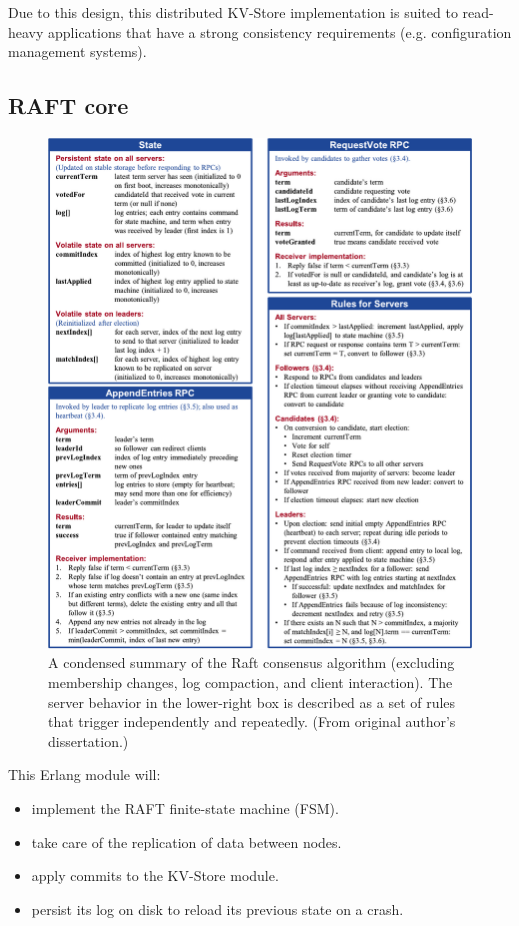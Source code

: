 \documentclass[a4paper]{article}
\begin{document}
Due to this design, this distributed KV-Store implementation is suited to 
read-heavy applications that have a strong consistency requirements 
(e.g. configuration management systems).

\subsection{RAFT core}
\label{sec:raft-core}

\begin{figure}
    \includegraphics[width=\textwidth]{raft_algorithm.pdf}
    \caption{A condensed summary of the Raft consensus algorithm (excluding membership changes, log compaction, and client interaction). The server behavior in the lower-right box is described as a set of rules that trigger independently and repeatedly. (From original author's dissertation.)}
    \label{fig:raft-algorithm}
\end{figure}

This Erlang module will: 
\begin{itemize}
    \item implement the RAFT finite-state machine (FSM).
    \item take care of the replication of data between nodes.
    \item apply commits to the KV-Store module.
    \item persist its log on disk to reload its previous state on a crash.
\end{itemize}
\end{document}
